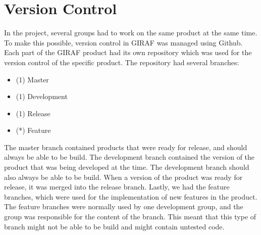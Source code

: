 \section{Version Control}
\label{sect:versionControl}
In the project, several groups had to work on the same product at the same time. To make this possible, version control in GIRAF was managed using Github. Each part of the GIRAF product had its own repository which was used for the version control of the specific product. The repository had several branches:
\begin{itemize}
    \item (1) Master
    \item (1) Development
    \item (1) Release
    \item (*) Feature
\end{itemize}

The master branch contained products that were ready for release, and should always be able to be build. The development branch contained the version of the product that was being developed at the time. The development branch should also always be able to be build. When a version of the product was ready for release, it was merged into the release branch. Lastly, we had the feature branches, which were used for the implementation of new features in the product. The feature branches were normally used by one development group, and the group was responsible for the content of the branch. This meant that this type of branch might not be able to be build and might contain untested code.
